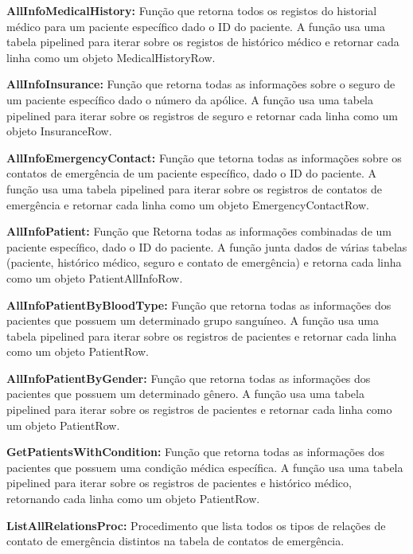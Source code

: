 \vspace{0.15cm}
\textbf{AllInfoMedicalHistory:} Função que retorna todos os registos do historial médico para um paciente específico dado o ID do paciente. A função usa uma tabela pipelined para iterar sobre os registos de histórico médico e retornar cada linha como um objeto MedicalHistoryRow.

\vspace{0.15cm}
\textbf{AllInfoInsurance:} Função que retorna todas as informações sobre o seguro de um paciente específico dado o número da apólice. A função usa uma tabela pipelined para iterar sobre os registros de seguro e retornar cada linha como um objeto InsuranceRow.

\vspace{0.15cm}
\textbf{AllInfoEmergencyContact:} Função que tetorna todas as informações sobre os contatos de emergência de um paciente específico, dado o ID do paciente. A função usa uma tabela pipelined para iterar sobre os registros de contatos de emergência e retornar cada linha como um objeto EmergencyContactRow.

\vspace{0.15cm}
 \textbf{AllInfoPatient:} Função que Retorna todas as informações combinadas de um paciente específico, dado o ID do paciente. A função junta dados de várias tabelas (paciente, histórico médico, seguro e contato de emergência) e retorna cada linha como um objeto PatientAllInfoRow.
 
\vspace{0.15cm}
\textbf{AllInfoPatientByBloodType:} Função que retorna todas as informações dos pacientes que possuem um determinado grupo sanguíneo. A função usa uma tabela pipelined para iterar sobre os registros de pacientes e retornar cada linha como um objeto PatientRow.

\vspace{0.15cm}
\textbf{AllInfoPatientByGender:} Função que retorna todas as informações dos pacientes que possuem um determinado gênero. A função usa uma tabela pipelined para iterar sobre os registros de pacientes e retornar cada linha como um objeto PatientRow.

\vspace{0.15cm}
\textbf{GetPatientsWithCondition:} Função que retorna todas as informações dos pacientes que possuem uma condição médica específica. A função usa uma tabela pipelined para iterar sobre os registros de pacientes e histórico médico, retornando cada linha como um objeto PatientRow.

\vspace{0.15cm}
\textbf{ListAllRelationsProc:} Procedimento que lista todos os tipos de relações de contato de emergência distintos na tabela de contatos de emergência.

